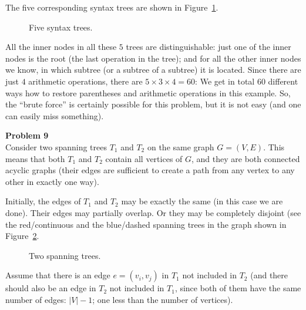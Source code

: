 \documentclass[jou]{apa6}
\begin{document}
The five corresponding syntax trees are shown in Figure~\ref{fig:syntaxtree}. 

\begin{figure}[!htb]
\caption{\label{fig:syntaxtree} Five syntax trees.}
\end{figure}

All the inner nodes in all these $5$ trees are distinguishable: just one of the inner nodes
is the root (the last operation in the tree); and for all the other inner nodes we know, 
in which subtree (or a subtree of a subtree) it is located. 
Since there are just $4$ arithmetic operations, there are $5 \times 3 \times 4 = 60$: 
We get in total $60$ different ways how to restore parentheses and arithmetic operations in 
this example. So, the ``brute force'' is certainly possible for this problem, but it is not easy 
(and one can easily miss something). 





\vspace{10pt}
{\bf Problem 9}\\
Consider two spanning trees $T_1$ and $T_2$ on the same graph $G=(V,E)$. 
This means that both $T_1$ and $T_2$ contain all vertices of $G$, and they 
are both connected acyclic graphs (their edges are sufficient to create a path from any vertex
to any other in exactly one way).

Initially, the edges of $T_1$ and $T_2$ may be exactly the same (in this case we are done). 
Their edges may partially overlap. Or they may be completely disjoint (see the red/continuous 
and the blue/dashed spanning trees in the graph shown in Figure~\ref{fig:tree1}. 

\begin{figure}[!htb]
\caption{\label{fig:tree1} Two spanning trees.}
\end{figure}

Assume that there is an edge $e=(v_i,v_j)$ in $T_1$ not included in $T_2$ (and there 
should also be an edge in $T_2$ not included in $T_1$, since both of them have the same
number of edges: $|V|-1$; one less than the number of vertices). 
\end{document}
